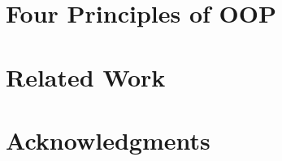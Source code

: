 \documentclass[sigplan,nonacm]{acmart}
\begin{document}
\section{Four Principles of OOP}
\label{sec:four}


\section{Related Work}
\label{sec:related}


\section{Acknowledgments}


{\raggedright

}

\clearpage
\end{document}
